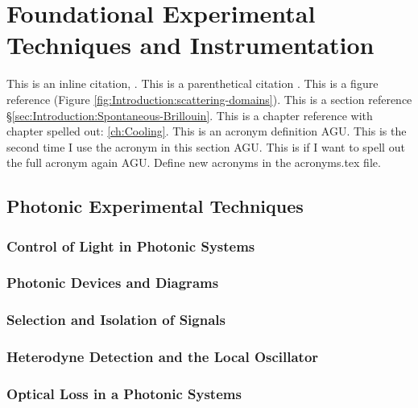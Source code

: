 \chapter{Foundational Experimental Techniques and Instrumentation}
\label{ch:Experimental}
\acresetall

This is an inline citation, \cite{boyd2020nonlinear}. This is a parenthetical citation \citep{boyd2020nonlinear}. This is a figure reference (Figure \ref{fig:Introduction:scattering-domains}). This is a section reference \S\ref{sec:Introduction:Spontaneous-Brillouin}. This is a chapter reference with chapter spelled out: \autoref{ch:Cooling}. This is an acronym definition \ac{AGU}. This is the second time I use the acronym in this section \ac{AGU}. This is if I want to spell out the full acronym again \acf{AGU}. Define new acronyms in the acronyms.tex file.


\section{Photonic Experimental Techniques}
\label{sec:Experimental:Experimental Techniques}
\lipsum[1]

  \subsection{Control of Light in Photonic Systems}
  \label{subsec:Experimental:Techniques:Control}
  \lipsum[1]

  \subsection{Photonic Devices and Diagrams}
  \label{subsec:Experimental:Techniques:Diagrams}
  \lipsum[1]

  \subsection{Selection and Isolation of Signals}
  \label{subsec:Experimental:Techniques:Signals}
  \lipsum[1]

  \subsection{Heterodyne Detection and the Local Oscillator}
  \label{subsec:Experimental:Techniques:Heterodyne}
  \lipsum[1]

  \subsection{Optical Loss in a Photonic Systems}
  \label{subsec:Experimental:Techniques:Loss}
  \lipsum[1]

